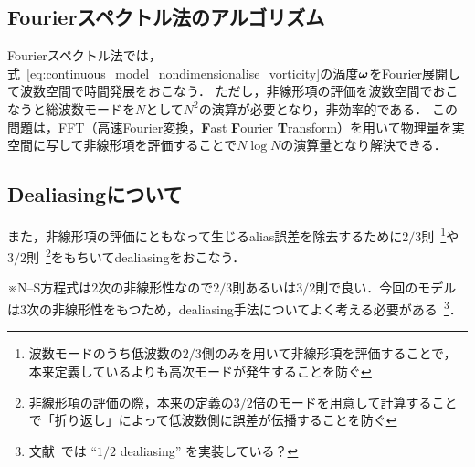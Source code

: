 \documentclass[12pt,dvipdfmx,svgnames,a4paper,uplatex]{ujarticle}
\theoremstyle{plain}
\begin{document}
\subsection{Fourierスペクトル法のアルゴリズム}
\label{sec:Fourier_spectral_method_algorithm}

Fourierスペクトル法では，式~\ref{eq:continuous_model_nondimensionalise_vorticity}の渦度\(\vb*{\omega}\)をFourier展開して波数空間で時間発展をおこなう．
ただし，非線形項の評価を波数空間でおこなうと総波数モードを\(N\)として\(N^2\)の演算が必要となり，非効率的である．
この問題は，FFT（高速Fourier変換，\textbf{F}ast \textbf{F}ourier \textbf{T}ransform）を用いて物理量を実空間に写して非線形項を評価することで\(N \log N\)の演算量となり解決できる．


\subsection{Dealiasingについて}
\label{sec:dealiasing}

また，非線形項の評価にともなって生じるalias誤差を除去するために\(2/3\)則~\footnote{波数モードのうち低波数の\(2/3\)側のみを用いて非線形項を評価することで，本来定義しているよりも高次モードが発生することを防ぐ}や\(3/2\)則~\footnote{非線形項の評価の際，本来の定義の\(3/2\)倍のモードを用意して計算することで「折り返し」によって低波数側に誤差が伝播することを防ぐ}をもちいてdealiasingをおこなう．

※N--S方程式は\(2\)次の非線形性なので\(2/3\)則あるいは\(3/2\)則で良い．今回のモデルは\(3\)次の非線形性をもつため，dealiasing手法についてよく考える必要がある~\footnote{文献~\cite{James}では ``\(1/2\) dealiasing'' を実装している？}．


\printbibliography[title=参考文献]
\end{document}
